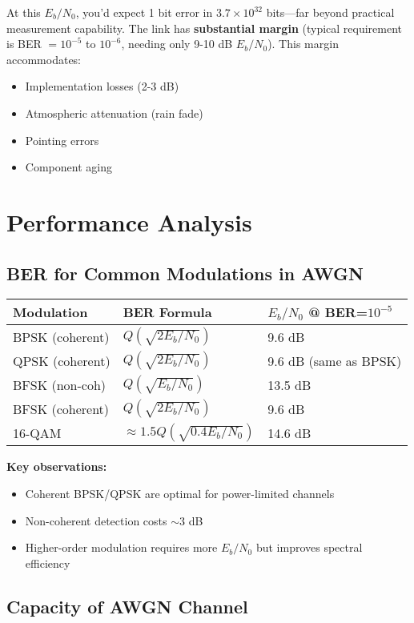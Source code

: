 At this $E_b/N_0$, you'd expect 1 bit error in $3.7 \times 10^{32}$ bits---far beyond practical measurement capability. The link has \textbf{substantial margin} (typical requirement is BER $= 10^{-5}$ to $10^{-6}$, needing only 9-10 dB $E_b/N_0$). This margin accommodates:
\begin{itemize}
\item Implementation losses (2-3 dB)
\item Atmospheric attenuation (rain fade)
\item Pointing errors
\item Component aging
\end{itemize}

\section{Performance Analysis}

\subsection{BER for Common Modulations in AWGN}

\begin{center}
\begin{tabular}{@{}lll@{}}
\toprule
\textbf{Modulation} & \textbf{BER Formula} & \textbf{$E_b/N_0$ @ BER=$10^{-5}$} \\
\midrule
BPSK (coherent) & $Q(\sqrt{2E_b/N_0})$ & 9.6 dB \\
QPSK (coherent) & $Q(\sqrt{2E_b/N_0})$ & 9.6 dB (same as BPSK) \\
BFSK (non-coh) & $Q(\sqrt{E_b/N_0})$ & 13.5 dB \\
BFSK (coherent) & $Q(\sqrt{2E_b/N_0})$ & 9.6 dB \\
16-QAM & $\approx 1.5Q(\sqrt{0.4E_b/N_0})$ & 14.6 dB \\
\bottomrule
\end{tabular}
\end{center}

\textbf{Key observations:}
\begin{itemize}
\item Coherent BPSK/QPSK are optimal for power-limited channels
\item Non-coherent detection costs $\sim$3 dB
\item Higher-order modulation requires more $E_b/N_0$ but improves spectral efficiency
\end{itemize}

\subsection{Capacity of AWGN Channel}

